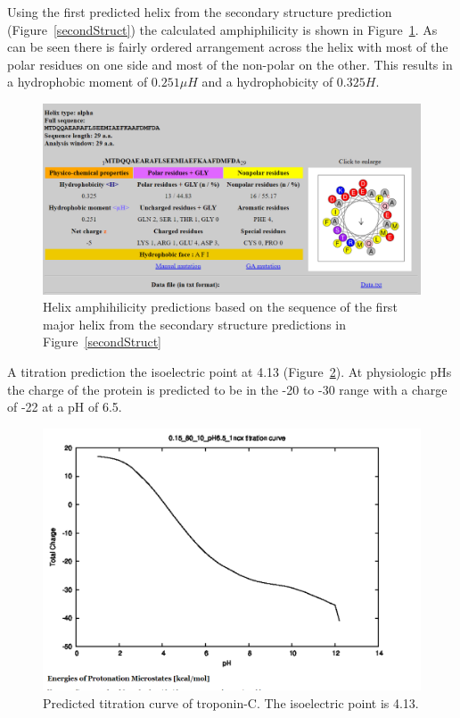 \documentclass[12pt]{article}
\begin{document}
	Using the first predicted helix from the secondary structure prediction (Figure~\ref{secondStruct}) the calculated amphiphilicity is shown in Figure~\ref{helix1}. As can be seen there is fairly ordered arrangement across the helix with most of the polar residues on one side and most of the non-polar on the other. This results in a hydrophobic moment of $0.251 \mu H$ and a hydrophobicity of $0.325 H$.
	
	\begin{figure}[H]
		\centering
		\includegraphics[width=.95\linewidth]{Helix1_plot.png}
		
		\caption{Helix amphihilicity predictions based on the sequence of the first major helix from the secondary structure predictions in Figure~\ref{secondStruct}}
		\label{helix1}
	\end{figure}
	
	A titration prediction the isoelectric point at 4.13 (Figure~\ref{titration}). At physiologic pHs the charge of the protein is predicted to be in the -20 to -30 range with a charge of -22 at a pH of 6.5.
	
	\begin{figure}[H]
		\centering
		\includegraphics[width=.75\linewidth]{ComputedTitration.png}
		
		\caption{Predicted titration curve of troponin-C. The isoelectric point is 4.13.}
		\label{titration}
	\end{figure}
	
\end{document}
